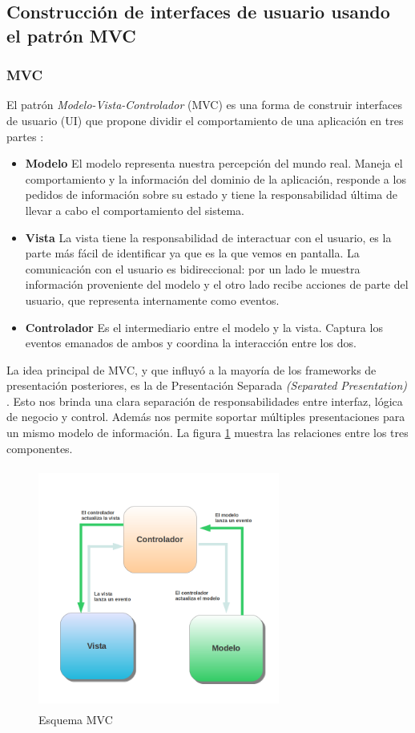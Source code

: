\subsection{Construcción de interfaces de usuario usando el patrón MVC}

	\subsubsection{MVC}
	El patrón \emph{Modelo-Vista-Controlador} (MVC) es una forma de construir
	interfaces de usuario (UI) que propone dividir el comportamiento de una
	aplicación en tres partes \cite{reenskaug79}:
		\begin {itemize}
		\item {\bf Modelo}
			El modelo representa nuestra percepción del mundo real. 
			Maneja el comportamiento y la información del dominio de la aplicación,
			responde a los pedidos de información sobre su estado y tiene la
			responsabilidad última de llevar a cabo el comportamiento del sistema.
			
		\item {\bf Vista}
			La vista tiene la responsabilidad de interactuar con el usuario, es la
			parte más fácil de identificar ya que es la que vemos en pantalla.
			La comunicación con el usuario es bidireccional:
			por un lado le muestra información proveniente del modelo y el otro lado
			recibe acciones de parte del usuario, que representa internamente como eventos.
			
		\item {\bf Controlador}
			Es el intermediario entre el modelo y la vista.
			Captura los eventos emanados de ambos y coordina la interacción entre los
			dos.
	\end {itemize}
	 
	La idea principal de MVC, y que influyó a la mayoría de los frameworks de
	presentación posteriores, es la de Presentación Separada \emph{(Separated
	Presentation)} \cite{burbeck87}.
	Esto nos brinda una clara separación de responsabilidades entre interfaz,
	lógica de negocio y control. Además nos permite soportar múltiples
	presentaciones para un mismo modelo de información.
	La figura \ref{mvc} muestra las relaciones entre los tres componentes.  
	
	\begin{figure}[h]
		\centering
		\includegraphics[width=300px, height=300px]{img/mvc} 
		\caption{Esquema MVC}
		\label{mvc}
	\end{figure}  
	
